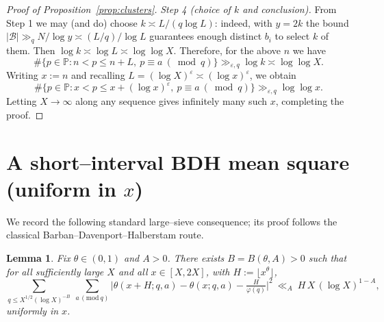 \documentclass[11pt]{amsart}
\newtheorem{lemma}[theorem]{Lemma}
\theoremstyle{definition}
\theoremstyle{remark}
\numberwithin{equation}{section}
\begin{document}
\begin{proof}[Proof of Proposition~\ref{prop:clusters}]
\smallskip
\noindent\emph{Step 4 (choice of $k$ and conclusion).}
From Step 1 we may (and do) choose $k\asymp L/(q\log L)$: indeed, with $y=2k$ the bound $|\mathcal B|\gg_q N/\log y\asymp (L/q)/\log L$ guarantees enough distinct $b_i$ to select $k$ of them. Then $\log k\asymp\log L\asymp\log\log X$. Therefore, for the above $n$ we have
\[
\#\{p\in\mathbb P: n<p\le n+L,\ p\equiv a\ (\bmod q)\}\gg_{\varepsilon,q}\log k\asymp \log\log X.
\]
Writing $x:=n$ and recalling $L=(\log X)^{\varepsilon}\asymp(\log x)^{\varepsilon}$, we obtain
\[
\#\{p\in\mathbb P: x<p\le x+(\log x)^{\varepsilon},\ p\equiv a\ (\bmod q)\}\gg_{\varepsilon,q}\log\log x.
\]
Letting $X\to\infty$ along any sequence gives infinitely many such $x$, completing the proof.
\end{proof}

\appendix
\section{A short--interval BDH mean square (uniform in $x$)}
We record the following standard large--sieve consequence; its proof follows the classical Barban–Davenport–Halberstam route.
\begin{lemma}\label{lem:BDH}
Fix $\theta\in(0,1)$ and $A>0$. There exists $B=B(\theta,A)>0$ such that for all sufficiently large $X$ and all $x\in[X,2X]$, with $H:=\lfloor x^\theta\rfloor$,
\[
\sum_{q\le X^{1/2}(\log X)^{-B}}\ \sum_{a\,(\mathrm{mod}\ q)}
\Big|\theta(x+H;q,a)-\theta(x;q,a)-\tfrac{H}{\varphi(q)}\Big|^2\ \ll_A\ H\,X\,(\log X)^{1-A},
\]
uniformly in $x$.
\end{lemma}
\end{document}
